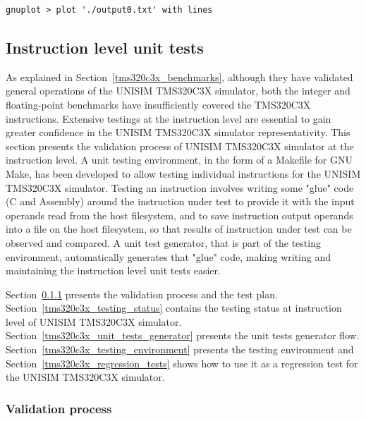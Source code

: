 \begin{verbatim}
gnuplot > plot './output0.txt' with lines
\end{verbatim}

\subsection{Instruction level unit tests}

As explained in Section~\ref{tms320c3x_benchmarks}, although they have validated general operations of the UNISIM TMS320C3X simulator, both the integer and floating-point benchmarks have insufficiently covered the TMS320C3X instructions.
Extensive testings at the instruction level are essential to gain greater confidence in the UNISIM TMS320C3X simulator representativity.
This section presents the validation process of UNISIM TMS320C3X simulator at the instruction level.
A unit testing environment, in the form of a Makefile for GNU Make, has been developed to allow testing individual instructions for the UNISIM TMS320C3X simulator.
Testing an instruction involves writing some "glue" code (C and Assembly) around the instruction under test to provide it with the input operands read from the host filesystem, and to save instruction output operands into a file on the host filesystem, so that results of instruction under test can be observed and compared.
A unit test generator, that is part of the testing environment, automatically generates that "glue" code, making writing and maintaining the instruction level unit tests easier.

Section~\ref{tms320c3x_validation_process} presents the validation process and the test plan.
Section~\ref{tms320c3x_testing_status} contains the testing status at instruction level of UNISIM TMS320C3X simulator.
Section~\ref{tms320c3x_unit_tests_generator} presents the unit tests generator flow.
Section~\ref{tms320c3x_testing_environment} presents the testing environment and Section~\ref{tms320c3x_regression_tests} shows how to use it as a regression test for the UNISIM TMS320C3X simulator.

\subsubsection{Validation process}
\label{tms320c3x_validation_process}


